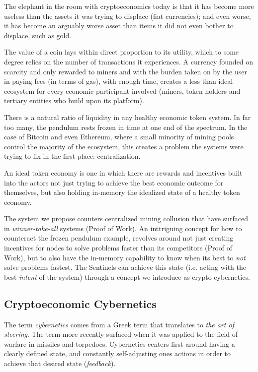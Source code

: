 \documentclass{article}
\begin{document}
The elephant in the room with cryptoeconomics today is that it has become more useless than the assets it was trying to displace (fiat currencies); and even worse, it has become an arguably worse asset than items it did not even bother to displace, such as gold.

The value of a coin lays within direct proportion to its utility, which to some degree relies on the number of transactions it experiences. A currency founded on scarcity and only rewarded to miners and with the burden taken on by the user in paying fees (in terms of gas), with enough time, creates a less than ideal ecosystem for every economic participant involved (miners, token holders and tertiary entities who build upon its platform).

There is a natural ratio of liquidity in any healthy economic token system. In far too many, the pendulum rests frozen in time at one end of the spectrum. In the case of Bitcoin and even Ethereum, where a small minority of mining pools control the majority of the ecosystem, this creates a problem the systems were trying to fix in the first place: centralization.

An ideal token economy is one in which there are rewards and incentives built into the actors not just trying to achieve the best economic outcome for themselves, but also holding in-memory the idealized state of a healthy token economy.

The system we propose counters centralized mining collusion that have surfaced in \textit{winner-take-all} systems (Proof of Work). An inttriguing concept for how to counteract the frozen pendulum example, revolves around not just creating incentives for nodes to solve problems faster than its competitors (Proof of Work), but to also have the in-memory capability to know when its best to \textit{not} solve problems fastest. The Sentinels can achieve this state (i.e. acting with the best \textit{intent} of the system) through a concept we introduce as crypto-cybernetics. 

\subsection{Cryptoeconomic Cybernetics}
The term \textit{cybernetics} comes from a Greek term that translates to \textit{the art of steering}. The term more recently surfaced when it was applied to the field of warfare in missiles and torpedoes. Cybernetics centers first around having a clearly defined {state}, and constantly self-adjusting ones actions in order to achieve that desired state (\textit{feedback}).
\end{document}
